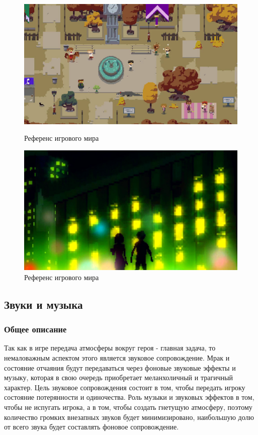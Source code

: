 \documentclass{article}
\begin{document}
	\begin{figure}[h]
		\begin{minipage}{0.4\textwidth}
			\centering
			\includegraphics[width=\textwidth]{images/park.jpg}
			\caption{Референс игрового мира}
			\label{fig:world1}
		\end{minipage} 
		\hfill
		\begin{minipage}{0.4\textwidth}
			\centering
			\includegraphics[width=\textwidth]{images/world.jpg}
			\caption{Референс игрового мира}
			\label{fig:world2}
		\end{minipage}
	\end{figure}
	
	\newpage	
	\subsection{Звуки и музыка}
	
	\subsubsection{Общее описание}
	
	Так как в игре передача атмосферы вокруг героя - главная задача, то немаловажным аспектом этого является звуковое 
	сопровождение. Мрак и состояние отчаяния будут передаваться через фоновые звуковые эффекты и музыку, которая в 
	свою очередь приобретает меланхоличный и трагичный характер. Цель звуковое сопровождения состоит в том,
	чтобы передать игроку состояние потерянности и одиночества. Роль музыки и звуковых эффектов в том, чтобы не испугать игрока,
	а в том, чтобы создать гнетущую атмосферу, поэтому количество громких внезапных звуков будет минимизировано, наибольшую долю 
	от всего звука будет составлять фоновое сопровождение. 
	
\end{document}
